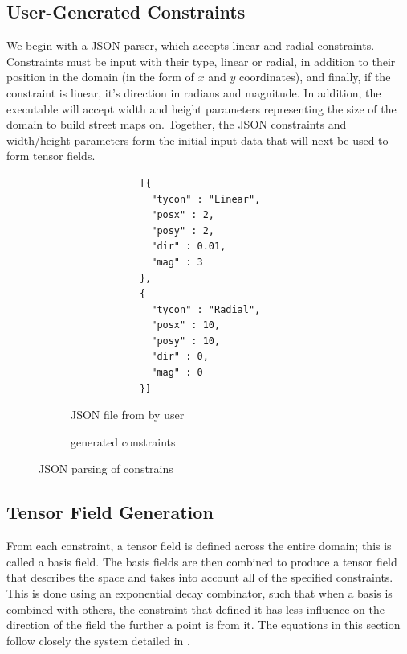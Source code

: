 \documentclass[twocolumn]{article}
\newcommand{\todo}[1]{\begin{center}\fbox{\parbox{150pt}{#1}}\end{center}}
\begin{document}
\subsection{User-Generated Constraints}
We begin with a JSON parser, which accepts linear and radial constraints.
Constraints must be input with their type, linear or radial, in addition to
their position in the domain (in the form of $x$ and $y$ coordinates), and
finally, if the constraint is linear, it’s direction in radians and magnitude.
In addition, the executable will accept width and height parameters
representing the size of the domain to build street maps on. Together, the JSON
constraints and width/height parameters form the initial input data that will
next be used to form tensor fields.

\begin{figure}[t!]
    \centering
    \begin{subfigure}[b]{2.4in}
        \begin{verbatim}
            [{
              "tycon" : "Linear",
              "posx" : 2,
              "posy" : 2,
              "dir" : 0.01,
              "mag" : 3
            },
            {
              "tycon" : "Radial",
              "posx" : 10,
              "posy" : 10,
              "dir" : 0,
              "mag" : 0
            }]
        \end{verbatim}
        \caption{JSON file from by user}
    \end{subfigure}
    \hspace{20pt}
    \begin{subfigure}[b]{2.4in}
        \todo{image from constraints to left}
        \caption{generated constraints}
    \end{subfigure}
\caption{JSON parsing of constrains}
\label{fig:json}
\end{figure}

\subsection{Tensor Field Generation}
From each constraint, a tensor field is defined across the entire domain; this
is called a basis field. The basis fields are then combined to produce a tensor
field that describes the space and takes into account all of the specified
constraints. This is done using an exponential decay combinator, such that when
a basis is combined with others, the constraint that defined it has less
influence on the direction of the field the further a point is from it. The
equations in this section follow closely the system detailed in \cite{chen}.
\end{document}
